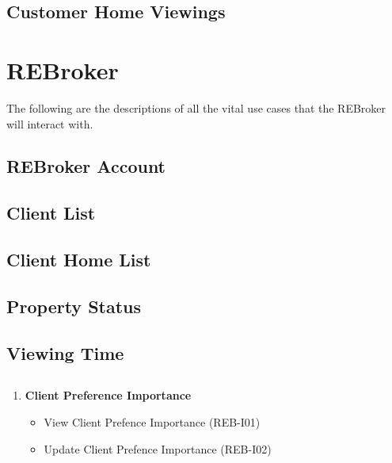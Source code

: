 \documentclass[11pt]{article}
\begin{document}
		\subsection{Customer Home Viewings}

	\section{REBroker}
	\begin{flushleft}
		The following are the descriptions of all the vital use cases that the REBroker will interact with. 
	\end{flushleft}
		
		\subsection{REBroker Account}
		
		\subsection{Client List}
		
		\subsection{Client Home List}
		
		\subsection{Property Status}
		
		\subsection{Viewing Time}
		
		\subsection{}
		
		\begin{enumerate}[i]
			\item \textbf{Client Preference Importance}
			\begin{itemize}
				\item View Client Prefence Importance (REB-I01)
				\item Update Client Prefence Importance (REB-I02)
			\end{itemize}
		\end{enumerate}
	
\end{document}
